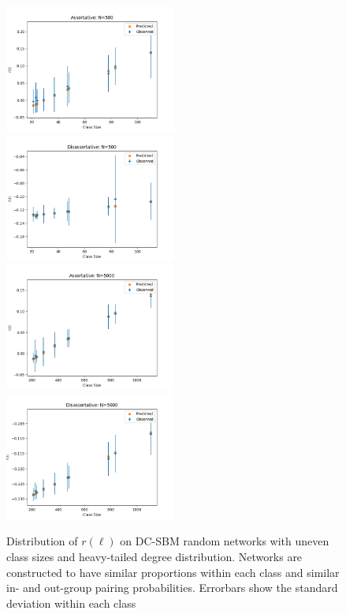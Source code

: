 \documentclass[12pt]{article}
\begin{document}
\begin{figure}[h!]
\includegraphics[width=0.5\textwidth]{assortative_N_500.png}
\includegraphics[width=0.5\textwidth]{disassortative_N_500.png}
\includegraphics[width=0.5\textwidth]{assortative_N_5000.png}
\includegraphics[width=0.5\textwidth]{disassortative_N_5000.png}
\caption{Distribution of $r(\ell)$ on DC-SBM random networks with uneven class sizes and heavy-tailed degree distribution.  Networks are constructed to have similar proportions within each class and similar in- and out-group pairing probabilities.  Errorbars show the standard deviation within each class}
\end{figure}
\end{document}
